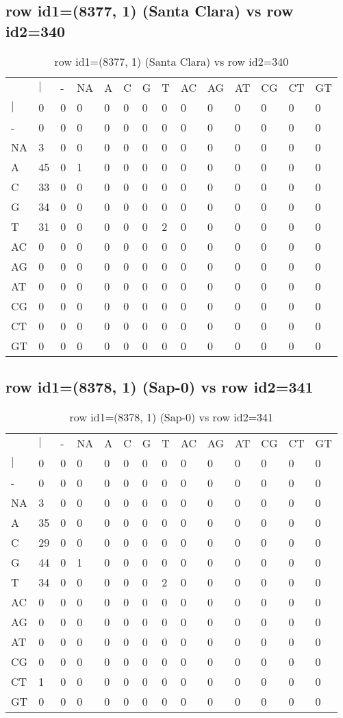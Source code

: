 \subsection{row id1=(8377, 1) (Santa Clara) vs row id2=340}
\begin{center}
\begin{longtable}{|l|l|l|l|l|l|l|l|l|l|l|l|l|l|}
\caption{row id1=(8377, 1) (Santa Clara) vs row id2=340} \label{table_dm610}\\
\hline
\\
\hline
&$|$&-&NA&A&C&G&T&AC&AG&AT&CG&CT&GT\\
$|$&0&0&0&0&0&0&0&0&0&0&0&0&0\\
-&0&0&0&0&0&0&0&0&0&0&0&0&0\\
NA&3&0&0&0&0&0&0&0&0&0&0&0&0\\
A&45&0&1&0&0&0&0&0&0&0&0&0&0\\
C&33&0&0&0&0&0&0&0&0&0&0&0&0\\
G&34&0&0&0&0&0&0&0&0&0&0&0&0\\
T&31&0&0&0&0&0&2&0&0&0&0&0&0\\
AC&0&0&0&0&0&0&0&0&0&0&0&0&0\\
AG&0&0&0&0&0&0&0&0&0&0&0&0&0\\
AT&0&0&0&0&0&0&0&0&0&0&0&0&0\\
CG&0&0&0&0&0&0&0&0&0&0&0&0&0\\
CT&0&0&0&0&0&0&0&0&0&0&0&0&0\\
GT&0&0&0&0&0&0&0&0&0&0&0&0&0\\
\hline
\end{longtable}
\end{center}

\subsection{row id1=(8378, 1) (Sap-0) vs row id2=341}
\begin{center}
\begin{longtable}{|l|l|l|l|l|l|l|l|l|l|l|l|l|l|}
\caption{row id1=(8378, 1) (Sap-0) vs row id2=341} \label{table_dm612}\\
\hline
\\
\hline
&$|$&-&NA&A&C&G&T&AC&AG&AT&CG&CT&GT\\
$|$&0&0&0&0&0&0&0&0&0&0&0&0&0\\
-&0&0&0&0&0&0&0&0&0&0&0&0&0\\
NA&3&0&0&0&0&0&0&0&0&0&0&0&0\\
A&35&0&0&0&0&0&0&0&0&0&0&0&0\\
C&29&0&0&0&0&0&0&0&0&0&0&0&0\\
G&44&0&1&0&0&0&0&0&0&0&0&0&0\\
T&34&0&0&0&0&0&2&0&0&0&0&0&0\\
AC&0&0&0&0&0&0&0&0&0&0&0&0&0\\
AG&0&0&0&0&0&0&0&0&0&0&0&0&0\\
AT&0&0&0&0&0&0&0&0&0&0&0&0&0\\
CG&0&0&0&0&0&0&0&0&0&0&0&0&0\\
CT&1&0&0&0&0&0&0&0&0&0&0&0&0\\
GT&0&0&0&0&0&0&0&0&0&0&0&0&0\\
\hline
\end{longtable}
\end{center}

